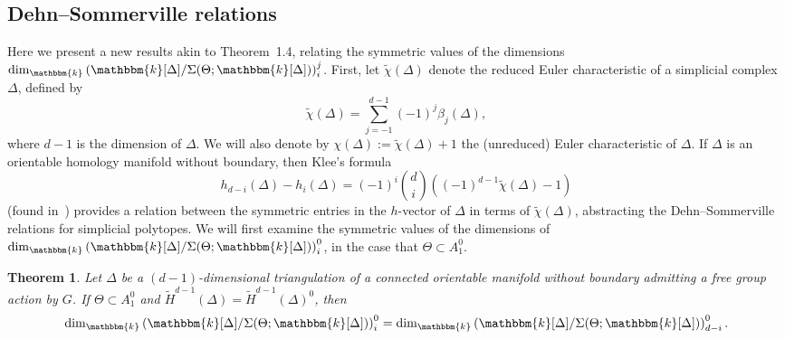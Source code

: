 \documentclass[10pt]{amsart}
\newtheorem{theo}{Theorem}[section]
\theoremstyle{definition}
\newcommand{\field}{\mathbbm{k}}
\begin{document}
\subsection{Dehn--Sommerville relations} Here we present a new results akin to Theorem~1.4, relating the symmetric values of the dimensions $\dim_\field \left(\field[\Delta]/\Sigma(\Theta;\field[\Delta])\right)_i^j$. First, let $\tilde{\chi}(\Delta)$ denote the reduced Euler characteristic of a simplicial complex $\Delta$, defined by
\[
\tilde{\chi}(\Delta)=\sum_{j=-1}^{d-1}(-1)^j\beta_j(\Delta),
\]
where $d-1$ is the dimension of $\Delta$. We will also denote by $\chi(\Delta):=\tilde{\chi}(\Delta)+1$ the (unreduced) Euler characteristic of $\Delta$. If $\Delta$ is an orientable homology manifold without boundary, then Klee's formula
\begin{equation}\label{KleesFormula}
h_{d-i}(\Delta)-h_i(\Delta)=(-1)^i\binom{d}{i}((-1)^{d-1}\tilde{\chi}(\Delta)-1)
\end{equation}
(found in~\cite{Klee}) provides a relation between the symmetric entries in the $h$-vector of $\Delta$ in terms of $\tilde{\chi}(\Delta)$, abstracting the Dehn--Sommerville relations for simplicial polytopes. We will first examine the symmetric values of the dimensions of $\dim_\field \left(\field[\Delta]/\Sigma(\Theta;\field[\Delta])\right)_i^0$, in the case that $\Theta\subset A_1^0$.

\begin{theo}\label{DSTheorem}
Let $\Delta$ be a $(d-1)$-dimensional triangulation of a connected orientable manifold without boundary admitting a free group action by $G$. If $\Theta\subset A_1^0$ and $\widetilde{H}^{d-1}(\Delta)=\widetilde{H}^{d-1}(\Delta)^0$, then
\[
\dim_\field \left(\field[\Delta]/\Sigma(\Theta;\field[\Delta])\right)_i^0=\dim_\field \left(\field[\Delta]/\Sigma(\Theta;\field[\Delta])\right)_{d-i}^0.
\]
\end{theo}
\end{document}

